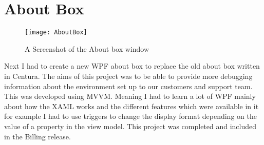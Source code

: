 \section{About Box}{
		\begin{figure}
		\centering
		\texttt{[image: AboutBox]}
		\caption{A Screenshot of the About box window}
		\label{fig:AboutBox}
	\end{figure}
	Next I had to create a new WPF about box to replace the old about box written in Centura. The aims of this project was to be able to provide more debugging information about the environment set up to our customers and support team. This was developed using MVVM. Meaning I had to learn a lot of WPF mainly about how the XAML works and the different features which were available in it for example I had to use triggers to change the display format depending on the value of a property in the view model. This project was completed and included in the Billing release.
}

